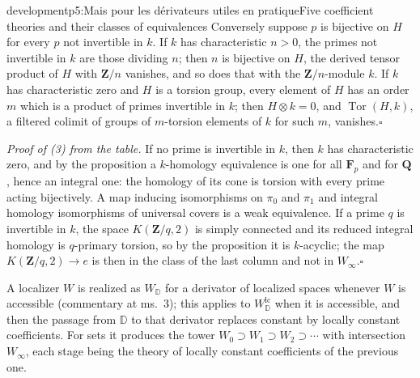 \begin{dcomment}{development}{p5:Mais pour les dérivateurs utiles en pratique}{Five coefficient theories and their classes of equivalences}
Conversely suppose $p$ is bijective on $H$ for every $p$ not invertible in $k$. If $k$ has characteristic $n>0$, the primes not invertible in $k$ are those dividing $n$; then $n$ is bijective on $H$, the derived tensor product of $H$ with $\mathbf Z/n$ vanishes, and so does that with the $\mathbf Z/n$-module $k$. If $k$ has characteristic zero and $H$ is a torsion group, every element of $H$ has an order $m$ which is a product of primes invertible in $k$; then $H\otimes k=0$, and $\operatorname{Tor}(H,k)$, a filtered colimit of groups of $m$-torsion elements of $k$ for such $m$, vanishes.\hfill$\square$

\textit{Proof of (3) from the table.}
If no prime is invertible in $k$, then $k$ has characteristic zero, and by the proposition a $k$-homology equivalence is one for all $\mathbf F_p$ and for $\mathbf Q$, hence an integral one: the homology of its cone is torsion with every prime acting bijectively. A map inducing isomorphisms on $\pi_0$ and $\pi_1$ and integral homology isomorphisms of universal covers is a weak equivalence. If a prime $q$ is invertible in $k$, the space $K(\mathbf Z/q,2)$ is simply connected and its reduced integral homology is $q$-primary torsion, so by the proposition it is $k$-acyclic; the map $K(\mathbf Z/q,2)\to e$ is then in the class of the last column and not in $W_\infty$.\hfill$\square$

A localizer $W$ is realized as $W_{\mathbb D}$ for a derivator of localized spaces whenever $W$ is accessible (commentary at ms.~3); this applies to $W^{\mathrm{lc}}_{\mathbb D}$ when it is accessible, and then the passage from $\mathbb D$ to that derivator replaces constant by locally constant coefficients. For sets it produces the tower $W_0\supset W_1\supset W_2\supset\cdots$ with intersection $W_\infty$, each stage being the theory of locally constant coefficients of the previous one.
\end{dcomment}
